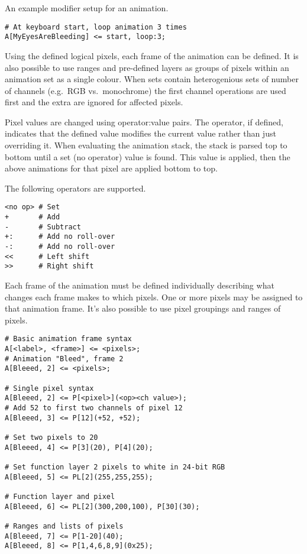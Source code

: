 \documentclass{kiibohd-template}
\begin{document}
An example modifier setup for an animation.

\begin{lstlisting}
# At keyboard start, loop animation 3 times
A[MyEyesAreBleeding] <= start, loop:3;
\end{lstlisting}

Using the defined logical pixels, each frame of the animation can be defined.
It is also possible to use ranges and pre-defined layers as groups of pixels within an animation set as a single colour.
When sets contain heterogenious sets of number of channels (e.g.\ RGB vs.\ monochrome) the first channel operations are used first and the extra are ignored for affected pixels.

Pixel values are changed using operator:value pairs.
The operator, if defined, indicates that the defined value modifies the current value rather than just overriding it.
When evaluating the animation stack, the stack is parsed top to bottom until a set (no operator) value is found.
This value is applied, then the above animations for that pixel are applied bottom to top.

The following operators are supported.

\begin{lstlisting}
<no op> # Set
+       # Add
-       # Subtract
+:      # Add no roll-over
-:      # Add no roll-over
<<      # Left shift
>>      # Right shift
\end{lstlisting}

Each frame of the animation must be defined individually describing what changes each frame makes to which pixels.
One or more pixels may be assigned to that animation frame.
It's also possible to use pixel groupings and ranges of pixels.

\begin{lstlisting}
# Basic animation frame syntax
A[<label>, <frame>] <= <pixels>;
# Animation "Bleed", frame 2
A[Bleeed, 2] <= <pixels>;

# Single pixel syntax
A[Bleeed, 2] <= P[<pixel>](<op><ch value>);
# Add 52 to first two channels of pixel 12
A[Bleeed, 3] <= P[12](+52, +52);

# Set two pixels to 20
A[Bleeed, 4] <= P[3](20), P[4](20);

# Set function layer 2 pixels to white in 24-bit RGB
A[Bleeed, 5] <= PL[2](255,255,255);

# Function layer and pixel
A[Bleeed, 6] <= PL[2](300,200,100), P[30](30);

# Ranges and lists of pixels
A[Bleeed, 7] <= P[1-20](40);
A[Bleeed, 8] <= P[1,4,6,8,9](0x25);
\end{lstlisting}
\end{document}

